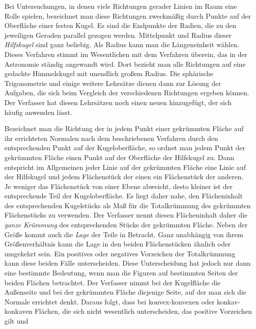 %
\par\indent Bei Untersuchungen, in denen viele Richtungen gerader Linien im Raum eine Rolle spielen, bezeichnet man diese Richtungen zweckmäßig durch Punkte auf der Oberfläche einer festen Kugel. Es sind die Endpunkte der Radien, die zu den jeweiligen Geraden parallel gezogen werden. Mittelpunkt und Radius dieser \textit{Hilfskugel} sind ganz beliebig. Als Radius kann man die Längeneinheit wählen. Dieses Verfahren stimmt im Wesentlichen mit dem Verfahren überein, das in der Astronomie ständig angewandt wird. Dort bezieht man alle Richtungen auf eine gedachte Himmelskugel mit unendlich großem Radius. Die sphärische Trigonometrie und einige weitere Lehrsätze dienen dann zur Lösung der Aufgaben, die sich beim Vergleich der verschiedenen Richtungen ergeben können. Der Verfasser hat diesen Lehrsätzen noch einen neuen hinzugefügt, der sich häufig anwenden lässt.

Bezeichnet man die Richtung der in jedem Punkt einer gekrümmten Fläche auf ihr errichteten Normalen nach dem beschriebenen Verfahren durch den entsprechenden Punkt auf der Kugeloberfläche, so ordnet man jedem Punkt der gekrümmten Fläche einen Punkt auf der Oberfläche der Hilfskugel zu. Dann entspricht im Allgemeinen jeder Linie auf der gekrümmten Fläche eine Linie auf der Hilfskugel und jedem Flächenstück der einen ein Flächenstück der anderen. Je weniger das Flächenstück von einer Ebene abweicht, desto kleiner ist der entsprechende Teil der Kugeloberfläche. Es liegt daher nahe, den Flächeninhalt des entsprechenden Kugelstücks als Maß für die Totalkrümmung des gekrümmten Flächenstücks zu verwenden. Der Verfasser nennt diesen Flächeninhalt daher die \textit{ganze Krümmung} des entsprechenden Stücks der gekrümmten Fläche. Neben der Größe kommt auch die \textit{Lage} der Teile in Betracht. Ganz unabhängig von ihrem Größenverhältnis kann die Lage in den beiden Flächenstücken ähnlich oder umgekehrt sein. Ein positives oder negatives Vorzeichen der Totalkrümmung kann diese beiden Fälle unterscheiden. Diese Unterscheidung hat jedoch nur dann eine bestimmte Bedeutung, wenn man die Figuren auf bestimmten Seiten der beiden Flächen betrachtet. Der Verfasser nimmt bei der Kugelfläche die Außenseite und bei der gekrümmten Fläche diejenige Seite, auf der man sich die Normale errichtet denkt. Daraus folgt, dass bei konvex-konvexen oder konkav-konkaven Flächen, die sich nicht wesentlich unterscheiden, das positive Vorzeichen gilt und %

